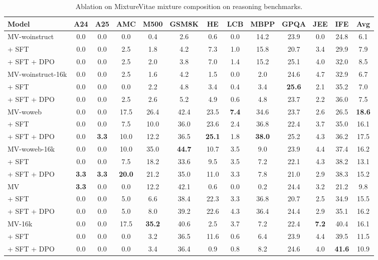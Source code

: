 \begin{table}[ht]
\centering
\caption{Ablation on MixtureVitae mixture composition on reasoning benchmarks.}
\label{tab:evalchemy_table1}
\scriptsize
\begin{tabular}{lcccccccccccc}
\toprule
\textbf{Model} & \textbf{A24} & \textbf{A25} & \textbf{AMC} & \textbf{M500} & \textbf{GSM8K} & \textbf{HE} & \textbf{LCB} & \textbf{MBPP} & \textbf{GPQA} & \textbf{JEE} & \textbf{IFE} & \textbf{Avg} \\
\midrule
MV-woinstruct & 0.0 & 0.0 & 0.0 & 0.4 & 2.6 & 0.6 & 0.0 & 14.2 & 23.9 & 0.0 & 24.8 & 6.1 \\
\quad + SFT & 0.0 & 0.0 & 2.5 & 1.8 & 4.2 & 7.3 & 1.0 & 15.8 & 20.7 & 3.4 & 29.9 & 7.9 \\
\quad + SFT + DPO & 0.0 & 0.0 & 2.5 & 2.0 & 3.8 & 7.0 & 1.4 & 15.2 & 25.1 & 4.0 & 32.0 & 8.5 \\
\midrule
\addlinespace[0.3em]
MV-woinstruct-16k & 0.0 & 0.0 & 2.5 & 1.6 & 4.2 & 1.5 & 0.0 & 2.0 & 24.6 & 4.7 & 32.9 & 6.7 \\
\quad + SFT & 0.0 & 0.0 & 0.0 & 2.2 & 4.8 & 3.4 & 0.4 & 3.4 & \textbf{25.6} & 2.1 & 35.2 & 7.0 \\
\quad + SFT + DPO & 0.0 & 0.0 & 2.5 & 2.6 & 5.2 & 4.9 & 0.6 & 4.8 & 23.7 & 2.2 & 36.0 & 7.5 \\
\midrule
\addlinespace[0.3em]
MV-woweb & 0.0 & 0.0 & 17.5 & 26.4 & 42.4 & 23.5 & \textbf{7.4} & 34.6 & 23.7 & 2.6 & 26.5 & \textbf{18.6} \\
\quad + SFT & 0.0 & 0.0 & 7.5 & 10.0 & 36.0 & 23.6 & 2.4 & 36.8 & 22.4 & 3.7 & 35.0 & 16.1 \\
\quad + SFT + DPO & 0.0 & \textbf{3.3} & 10.0 & 12.2 & 36.5 & \textbf{25.1} & 1.8 & \textbf{38.0} & 25.2 & 4.3 & 36.2 & 17.5 \\
\midrule
\addlinespace[0.3em]
MV-woweb-16k & 0.0 & 0.0 & 10.0 & 35.0 & \textbf{44.7} & 10.7 & 3.5 & 9.0 & 23.9 & 4.4 & 37.4 & 16.2 \\
\quad + SFT & 0.0 & 0.0 & 7.5 & 18.2 & 33.6 & 9.5 & 3.5 & 7.2 & 22.1 & 4.3 & 38.2 & 13.1 \\
\quad + SFT + DPO & \textbf{3.3} & \textbf{3.3} & \textbf{20.0} & 21.2 & 35.0 & 11.0 & 3.3 & 7.8 & 21.0 & 2.9 & 38.3 & 15.2 \\
\midrule
\addlinespace[0.3em]
MV & \textbf{3.3} & 0.0 & 0.0 & 12.2 & 42.1 & 0.6 & 0.0 & 0.2 & 24.4 & 3.2 & 21.2 & 9.8 \\
\quad + SFT & 0.0 & 0.0 & 5.0 & 6.6 & 38.4 & 22.3 & 3.3 & 36.8 & 20.7 & 2.5 & 34.9 & 15.5 \\
\quad + SFT + DPO & 0.0 & 0.0 & 5.0 & 8.0 & 39.2 & 22.6 & 4.3 & 36.4 & 24.4 & 2.9 & 35.1 & 16.2 \\
\midrule
\addlinespace[0.3em]
MV-16k & 0.0 & 0.0 & 17.5 & \textbf{35.2} & 40.6 & 2.5 & 3.7 & 7.2 & 22.4 & \textbf{7.2} & 40.4 & 16.1 \\
\quad + SFT & 0.0 & 0.0 & 0.0 & 3.2 & 36.5 & 11.6 & 0.6 & 6.4 & 23.9 & 4.4 & 39.5 & 11.5 \\
\quad + SFT + DPO & 0.0 & 0.0 & 0.0 & 3.4 & 36.4 & 0.9 & 0.8 & 8.2 & 24.6 & 4.0 & \textbf{41.6} & 10.9 \\
\bottomrule
\end{tabular}
\end{table}



